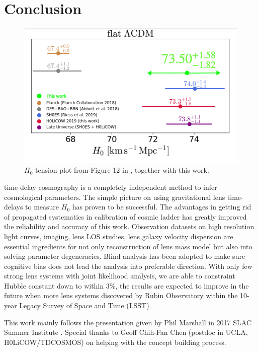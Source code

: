 \documentclass{cosmo}
\begin{document}
\section{Conclusion}
\begin{figure}[h]
        \centering
        \includegraphics[width=1\textwidth]{fig20_2.png}
        \caption{$H_\mathrm{0}$ tension plot from Figure 12 in \cite{Wong2019}, together with this work.}
        \label{fig14}
\end{figure}
time-delay cosmography is a completely independent method to infer cosmological parameters. The simple picture on using gravitational lens time-delays to measure $H_\mathrm{0}$ has proven to be successful. The advantages in getting rid of propagated systematics in calibration of cosmic ladder has greatly improved the reliability and accuracy of this work. Observation datasets on high resolution light curves, imaging, lens LOS studies, lens galaxy velocity dispersion are essential ingredients for not only reconstruction of lens mass model but also into solving parameter degeneracies. Blind analysis has been adopted to make sure cognitive bias does not lead the analysis into preferable direction. With only few strong lens systems with joint likelihood analysis, we are able to constraint Hubble constant down to within $3 \%$, the results are expected to improve in the future when more lens systems discovered by Rubin Observatory within the 10-year Legacy Survey of Space and Time (LSST). 

\begin{acknowledgement}
This work mainly follows the presentation
given by Phil Marshall in 2017 SLAC Summer Institute \citep{Matshall2017}.
Special thanks to Geoff Chih-Fan Chen (postdoc in UCLA,
H0LiCOW/TDCOSMOS) on helping with the concept building process.
\end{acknowledgement}

%
%
\end{document}
